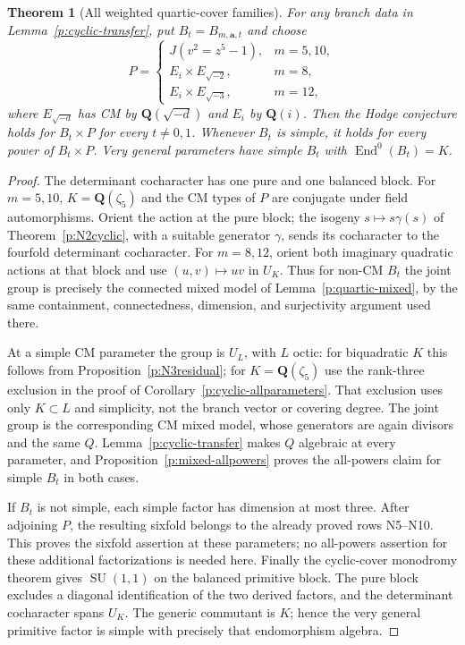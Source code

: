 \documentclass[10pt,reqno]{article}
\theoremstyle{emphasizedplain}
\newtheorem{theorem}{Theorem}[section]
\theoremstyle{emphasizeddefinition}
\theoremstyle{emphasizeddefinition}
\DeclareMathOperator{\End}{End}
\DeclareMathOperator{\SU}{SU}
\newcommand{\Q}{\mathbf Q}
\begin{document}
\begin{theorem}[All weighted quartic-cover families]\label{p:weighted-families}
For any branch data in Lemma~\ref{p:cyclic-transfer}, put
$B_t=B_{m,\boldsymbol a,t}$ and choose
\[
 P=\begin{cases}
 J(v^2=z^5-1),&m=5,10,\\
 E_i\times E_{\sqrt{-2}},&m=8,\\
 E_i\times E_{\sqrt{-3}},&m=12,
 \end{cases}
\]
where $E_{\sqrt{-d}}$ has CM by $\Q(\sqrt{-d})$ and $E_i$ by
$\Q(i)$. Then the Hodge conjecture holds for $B_t\times P$ for every
$t\ne0,1$. Whenever $B_t$ is simple, it holds for every power of
$B_t\times P$. Very general parameters have simple $B_t$ with
$\End^0(B_t)=K$.
\end{theorem}
\begin{proof}
The determinant cocharacter has one pure and one balanced block.
For $m=5,10$, $K=\Q(\zeta_5)$ and the CM types of $P$ are conjugate
under field automorphisms. Orient the action at the pure block;
the isogeny $s\mapsto s\gamma(s)$ of Theorem~\ref{p:N2cyclic},
with a suitable generator $\gamma$, sends its cocharacter to the
fourfold determinant cocharacter. For $m=8,12$, orient both imaginary
quadratic actions at that block and use $(u,v)\mapsto uv$ in $U_K$.
Thus for non-CM $B_t$ the joint group is precisely the connected
mixed model of Lemma~\ref{p:quartic-mixed}, by the same containment,
connectedness, dimension, and surjectivity argument used there.

At a simple CM parameter the group is $U_L$, with $L$ octic:
for biquadratic $K$ this follows from
Proposition~\ref{p:N3residual}; for $K=\Q(\zeta_5)$ use the
rank-three exclusion in the proof of
Corollary~\ref{p:cyclic-allparameters}. That exclusion uses only
$K\subset L$ and simplicity, not the branch vector or covering degree.
The joint group is the corresponding CM mixed model, whose generators
are again divisors and the same $Q$. Lemma~\ref{p:cyclic-transfer}
makes $Q$ algebraic at every parameter, and
Proposition~\ref{p:mixed-allpowers} proves the all-powers claim for
simple $B_t$ in both cases.

If $B_t$ is not simple, each simple factor has dimension at most
three. After adjoining $P$, the resulting sixfold belongs to the
already proved rows N5--N10. This proves the sixfold assertion at
these parameters; no all-powers assertion for these additional
factorizations is needed here.
Finally the cyclic-cover monodromy theorem
\cite[Proposition 4.7(i)]{MoonenCyclic} gives $\SU(1,1)$ on the
balanced primitive block. The pure block excludes a diagonal
identification of the two derived factors, and the determinant
cocharacter spans $U_K$. The generic commutant is $K$; hence the
very general primitive factor is simple with precisely that
endomorphism algebra.
\end{proof}
\end{document}
